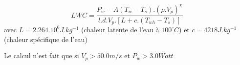 \[
LWC = \frac{ P_w - A(T_w-T_s).(\rho.V_p)^\chi}
              { l.d.V_p.[ L+c.(T_{wh} - T_s) ] }
\]
avec $L = 2.264.10^6 J.kg^{-1}$ (chaleur latente de l'eau \`a $100^\circ C$) et
$c = 4218 J.kg^{-1}$ (chaleur sp\'ecifique de l'eau)

Le calcul n'est fait que si $V_p > 50.0 m/s$ et
$P_w > 3.0 Watt $
